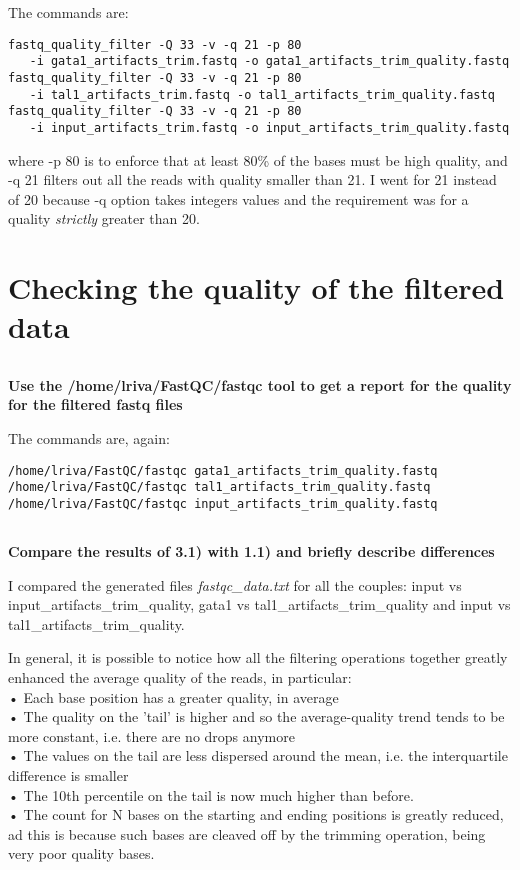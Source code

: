 \documentclass[12pt, a4paper]{article}
\begin{document}
The commands are:

\begin{verbatim}
fastq_quality_filter -Q 33 -v -q 21 -p 80
   -i gata1_artifacts_trim.fastq -o gata1_artifacts_trim_quality.fastq
fastq_quality_filter -Q 33 -v -q 21 -p 80
   -i tal1_artifacts_trim.fastq -o tal1_artifacts_trim_quality.fastq
fastq_quality_filter -Q 33 -v -q 21 -p 80
   -i input_artifacts_trim.fastq -o input_artifacts_trim_quality.fastq
\end{verbatim}

where -p 80 is to enforce that at least 80\% of the bases must be high quality, and -q 21 filters out all the reads with quality smaller than 21. I went for 21 instead of 20 because -q option takes integers values and the requirement was for a quality \textit{strictly} greater than 20.

\section{Checking the quality of the filtered data}

\subsection{}
\textbf{Use the /home/lriva/FastQC/fastqc tool to get a report for the quality for the filtered fastq files}

The commands are, again:

\begin{verbatim}
/home/lriva/FastQC/fastqc gata1_artifacts_trim_quality.fastq
/home/lriva/FastQC/fastqc tal1_artifacts_trim_quality.fastq
/home/lriva/FastQC/fastqc input_artifacts_trim_quality.fastq
\end{verbatim}

\subsection{}
\textbf{Compare the results of 3.1) with 1.1) and briefly describe differences}

I compared the generated files \textit{fastqc\_data.txt} for all the couples: input vs input\_artifacts\_trim\_quality, gata1 vs tal1\_artifacts\_trim\_quality and input vs tal1\_artifacts\_trim\_quality.

In general, it is possible to notice how all the filtering operations together greatly enhanced the average quality of the reads, in particular:\\
• Each base position has a greater quality, in average\\
• The quality on the 'tail' is higher and so the average-quality trend tends to be more constant, i.e. there are no drops anymore\\
• The values on the tail are less dispersed around the mean, i.e. the interquartile difference is smaller\\
• The 10th percentile on the tail is now much higher than before.\\
• The count for N bases on the starting and ending positions is greatly reduced, ad this is because such bases are cleaved off by the trimming operation, being very poor quality bases.\\
\end{document}
